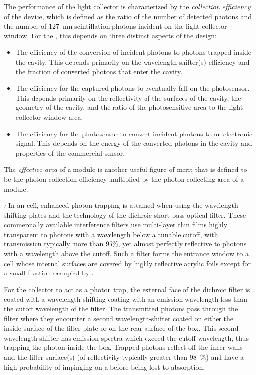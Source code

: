 The performance of the light collector is characterized by the \emph{collection efficiency} of the device, which is defined as the ratio of the number of detected photons and the number of \SI{127}{nm} scintillation photons incident on the light collector window.  For the , this depends on three distinct aspects of the design:
\begin{itemize}
    \item The efficiency of the conversion of incident  photons to photons trapped inside the cavity. This depends primarily on the wavelength shifter(s) efficiency and the fraction of converted photons that enter the cavity.
    \item The efficiency for the captured photons to eventually fall on the photosensor. This depends primarily on the reflectivity of the surfaces of the cavity, the geometry of the cavity, and the ratio of the photosensitive area to the light collector window area.
    \item The efficiency for the photosensor to convert incident photons to an electronic signal. This depends on the energy of the converted photons in the cavity and properties of the commercial sensor.
\end{itemize}
The \emph{effective area} of a  module is another useful figure-of-merit that is defined to be the photon collection efficiency multiplied by the photon collecting area of a  module. 

\textit{:} In an  cell, enhanced photon trapping is attained when using the wavelength--shifting plates and the technology of the dichroic short-pass optical filter. These commercially available interference filters use multi-layer thin films highly transparent to photons with a wavelength below a tunable cutoff, 
with transmission typically more than 95\%, yet almost perfectly reflective to photons with a wavelength above the cutoff.  Such a filter forms the entrance window to a cell whose internal surfaces are covered by highly reflective acrylic foils
except for a small fraction occupied by .

For the collector to act as a photon trap, the external face of the dichroic filter is coated with a wavelength shifting coating with an emission wavelength less than the cutoff wavelength of the filter. 
The transmitted photons pass through the filter where they encounter a second wavelength-shifter coated on either the inside surface of the filter plate or on the rear surface of the box.
This second wavelength-shifter has emission spectra which exceed the cutoff wavelength, thus trapping the photon inside the box.
Trapped photons reflect off the inner walls and the filter surface(s) (of reflectivity typically greater than \SI{98}{\%}) 
and have a high probability of impinging on a  before being lost to absorption. 

